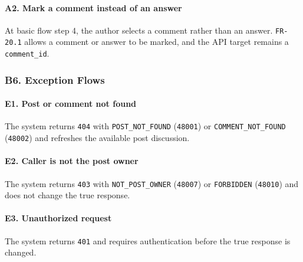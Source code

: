 \documentclass[12pt]{article}
\begin{document}
\hypertarget{sec:a2-mark-a-comment-instead-of-an-answer}{}
\paragraph*{A2. Mark a comment instead of an answer}
\par\medskip

At basic flow step 4, the author selects a comment rather than an answer. \texttt{FR-20.1} allows a comment or answer to be marked, and the API target remains a \texttt{comment\_id}.
\par\medskip

\hypertarget{sec:b6-exception-flows}{}
\subsubsection*{B6. Exception Flows}
\par\medskip

\hypertarget{sec:e1-post-or-comment-not-found}{}
\paragraph*{E1. Post or comment not found}
\par\medskip

The system returns \texttt{404} with \texttt{POST\_NOT\_FOUND} (\texttt{48001}) or \texttt{COMMENT\_NOT\_FOUND} (\texttt{48002}) and refreshes the available post discussion.
\par\medskip

\hypertarget{sec:e2-caller-is-not-the-post-owner}{}
\paragraph*{E2. Caller is not the post owner}
\par\medskip

The system returns \texttt{403} with \texttt{NOT\_POST\_OWNER} (\texttt{48007}) or \texttt{FORBIDDEN} (\texttt{48010}) and does not change the true response.
\par\medskip

\hypertarget{sec:e3-unauthorized-request}{}
\paragraph*{E3. Unauthorized request}
\par\medskip

The system returns \texttt{401} and requires authentication before the true response is changed.
\par\medskip
\end{document}
